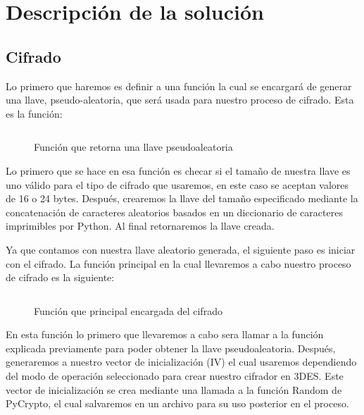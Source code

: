 \documentclass[10pt]{article}
\begin{document}
\section{Descripción de la solución}
   \subsection{Cifrado}
      Lo primero que haremos es definir a una función la cual se encargará de generar una llave, pseudo-aleatoria, que será usada para nuestro proceso de cifrado. Esta es la función:
      
      \begin{figure}[H]
         \inputminted[linenos, firstnumber=1, breaklines, tabsize=4, firstline=78, lastline=84]{python}{code/App.py}
         \caption{Función que retorna una llave pseudoaleatoria}
      \end{figure}

      Lo primero que se hace en esa función es checar si el tamaño de nuestra llave es uno válido para el tipo de cifrado que usaremos, en este caso se aceptan valores de 16 o 24 bytes. Después, crearemos la llave del tamaño especificado mediante la concatenación de caracteres aleatorios basados en un diccionario de caracteres imprimibles por Python. Al final retornaremos la llave creada.

      Ya que contamos con nuestra llave aleatorio generada, el siguiente paso es iniciar con el cifrado. La función principal en la cual llevaremos a cabo nuestro proceso de cifrado es la siguiente:
      \begin{figure}[H]
         \inputminted[linenos, firstnumber=1, breaklines, tabsize=4, firstline=115, lastline=126]{python}{code/App.py}
         \caption{Función que principal encargada del cifrado}
      \end{figure}

      En esta función lo primero que llevaremos a cabo sera llamar a la función explicada previamente para poder obtener la llave pseudoaleatoria. Después, generaremos a nuestro vector de inicialización (IV) el cual usaremos dependiendo del modo de operación seleccionado para crear nuestro cifrador en 3DES. Este vector de inicialización se crea mediante una llamada a la función Random de PyCrypto, el cual salvaremos en un archivo para su uso posterior en el proceso.
\end{document}
